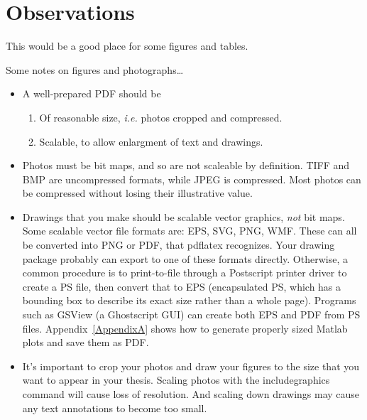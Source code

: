\chapter{Observations}

This would be a good place for some figures and tables.

Some notes on figures and photographs\ldots

\begin{itemize}
\item A well-prepared PDF should be 
  \begin{enumerate}
    \item Of reasonable size, {\it i.e.} photos cropped and compressed.
    \item Scalable, to allow enlargment of text and drawings. 
  \end{enumerate} 
\item Photos must be bit maps, and so are not scaleable by definition. TIFF and
BMP are uncompressed formats, while JPEG is compressed. Most photos can be
compressed without losing their illustrative value.
\item Drawings that you make should be scalable vector graphics, \emph{not} 
bit maps. Some scalable vector file formats are: EPS, SVG, PNG, WMF. These can
all be converted into PNG or PDF, that pdflatex recognizes. Your drawing 
package probably can export to one of these formats directly. Otherwise, a 
common procedure is to print-to-file through a Postscript printer driver to 
create a PS file, then convert that to EPS (encapsulated PS, which has a 
bounding box to describe its exact size rather than a whole page). 
Programs such as GSView (a Ghostscript GUI) can create both EPS and PDF from PS files.
Appendix~\ref{AppendixA} shows how to generate properly sized Matlab plots and save them as PDF.
\item It's important to crop your photos and draw your figures to the size that
you want to appear in your thesis. Scaling photos with the 
includegraphics command will cause loss of resolution. And scaling down 
drawings may cause any text annotations to become too small.
\end{itemize}
 

